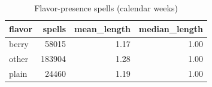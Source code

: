 \begin{table}
\caption{Flavor-presence spells (calendar weeks)}
\begin{tabular}{lrrr}
\toprule
flavor & spells & mean\_length & median\_length \\
\midrule
berry & 58015 & 1.17 & 1.00 \\
other & 183904 & 1.28 & 1.00 \\
plain & 24460 & 1.19 & 1.00 \\
\bottomrule
\end{tabular}
\end{table}
